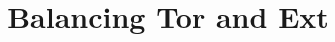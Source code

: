 \documentclass{ximera}
\title{Balancing Tor and Ext}
\begin{document}
\begin{abstract}

\end{abstract}
\maketitle

\end{document}
